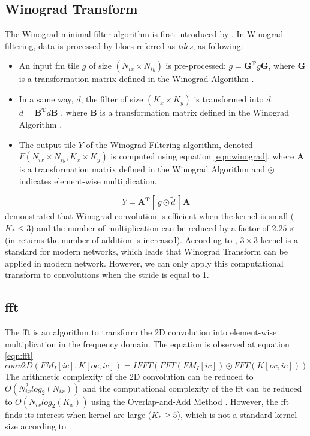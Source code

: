 \subsection{Winograd Transform}
The Winograd minimal filter algorithm is first introduced by \cite{winograd_arithmetic_1980}. In Winograd filtering, data is processed by blocs referred as \textit{tiles}, as following:
\begin{itemize}
    \item An input \acrshort{fm} tile $g$ of size $(N_{ix} \times N_{iy})$ is pre-processed: $\tilde{g} = \boldsymbol{G^{T}} g \boldsymbol{G} $, where $\boldsymbol{G}$ is a transformation matrix defined in the Winograd Algorithm \cite{winograd_arithmetic_1980}.
    \item In a same way, $d$, the filter of size $(K_x \times K_y)$ is transformed into $\tilde{d}$: $\tilde{d} = \boldsymbol{B^{T}} d \boldsymbol{B}$ , where $\boldsymbol{B}$ is a transformation matrix defined in the Winograd Algorithm \cite{winograd_arithmetic_1980}.
    \item The output tile $Y$ of the Winograd Filtering algorithm, denoted $F(N_{ix} \times N_{iy}, K_x \times K_y)$ is computed using equation \ref{eqn:winograd}, where $\boldsymbol{A}$ is a transformation matrix defined in the Winograd Algorithm \cite{winograd_arithmetic_1980} and $\odot$ indicates element-wise multiplication.
\end{itemize}
\begin{equation}
\label{eqn:winograd}
Y = \boldsymbol{A^{T}} [ \ \tilde{g} \odot \tilde{d} \ ] \boldsymbol{A}
\end{equation}
\cite{lavin_fast_2015} demonstrated that Winograd convolution is efficient when the kernel is small ($K_* \leq 3$) and the number of multiplication can be reduced by a factor of $2.25 \times$ (in returns the number of addition is increased). According to \cite{sandler_mobilenetv2_2019}, $3 \times 3$ kernel is a standard for modern networks, which leads that Winograd Transform can be applied in modern network. However, we can only apply this computational transform to convolutions when the stride is equal to 1.
\subsection{\acrfull{fft}}
The \acrshort{fft} is an algorithm to transform the 2D convolution into element-wise multiplication in the frequency domain. The equation is observed at equation \ref{eqn:fft}
\begin{equation}
\label{eqn:fft}
conv2D(FM_{I}[ic], K[oc, ic]) = IFFT( FFT(FM_{I}[ic]) \odot FFT(K[oc, ic]) )
\end{equation}
The arithmetic complexity of the 2D convolution can be reduced to $O(N_{ix}^2 log_2(N_{ix}))$ \cite{jong_hwan_ko_design_2017} and the computational complexity of the \acrshort{fft} can be reduced to $O(N_{ix} log_2(K_{x}))$ using the Overlap-and-Add Method \cite{w_smith_scientist_1997}.
However, the \acrshort{fft} finds its interest when kernel are large \cite{lavin_fast_2015} ($K_* \geq 5$), which is not a standard kernel size according to \cite{sandler_mobilenetv2_2019}.
